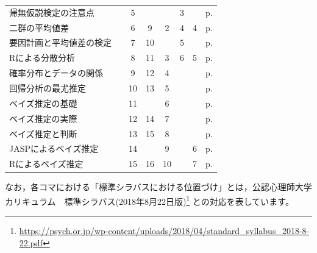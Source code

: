 \documentclass[dvipsnames]{ltjsarticle}
\begin{document}
\begin{table}
\begin{tabular}[t]{lccccccc}
		帰無仮説検定の注意点   &      & 5  &     &       & 3  &    & p.\pageref{s19_NHST2}                \\
		二群の平均値差      &      & 6  & 9   & 2     & 4  & 4  & p.\pageref{s20_ttest}                \\
		要因計画と平均値差の検定 &      & 7  & 10  &       & 5  &    & p.\pageref{s21_anova}                \\
		Rによる分散分析     &      & 8  & 11  & 3     & 6  & 5  & p.\pageref{s22_anova_onR}            \\
		確率分布とデータの関係  &      & 9  & 12  & 4     &    &    & p.\pageref{s23_likelihood}           \\
		回帰分析の最尤推定    &      & 10 & 13  & 5     &    &    & p.\pageref{s24_maximum_likelihood}   \\
		ベイズ推定の基礎     &      & 11 &     & 6     &    &    & p.\pageref{s25_bayesian1}            \\
		ベイズ推定の実際     &      & 12 & 14  & 7     &    &    & p.\pageref{s26_bayesian2}            \\
		ベイズ推定と判断     &      & 13 & 15  & 8     &    &    & p.\pageref{s27_bayesian3}            \\
		JASPによるベイズ推定 &      & 14 &     & 9     &    & 6  & p.\pageref{s28_jasp}                 \\
		Rによるベイズ推定    &      & 15 & 16  & 10    &    & 7  & p.\pageref{s29_brms}                 \\\hline
	\end{tabular}
\end{table}



なお，各コマにおける「標準シラバスにおける位置づけ」とは，公認心理師大学カリキュラム　標準シラバス(2018年8月22日版)\footnote{\url{https://psych.or.jp/wp-content/uploads/2018/04/standard_syllabus_2018-8-22.pdf}} との対応を表しています。




































\end{document}
